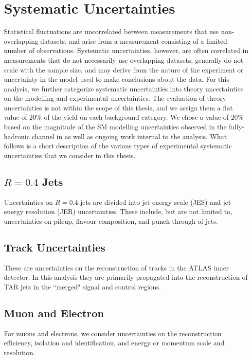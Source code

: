 \section{Systematic Uncertainties}
Statistical fluctuations are uncorrelated between measurements that use non-overlapping datasets, and arise from a measurement consisting of a limited number of observations. Systematic uncertainties, however, are often correlated in measurements that do not necessarily use overlapping datasets, generally do not scale with the sample size, and may derive from the nature of the experiment or uncertainty in the model used to make conclusions about the data.  For this analysis, we further categorize systematic uncertainties into theory uncertainties on the modelling and experimental uncertainties. The evaluation of theory uncertainties is not within the scope of this thesis, and we assign them a flat value of 20\% of the yield on each background category. We chose a value of 20\% based on the magnitude of the SM modelling uncertainties observed in the fully-hadronic channel in \cite{had_analy} as well as ongoing work internal to the analysis. What follows is a short description of the various types of experimental systematic uncertainties that we consider in this thesis.

\subsection{$R=0.4$ Jets}
Uncertainties on $R=0.4$ jets are divided into jet energy scale (JES) and jet energy resolution (JER) uncertainties. These include, but are not limited to, uncertainties on pileup, flavour composition, and punch-through of jets.

\subsection{Track Uncertainties}
These are uncertainties on the reconstruction of tracks in the ATLAS inner detector. In this analysis they are primarily propagated into the reconstruction of TAR jets in the ``merged" signal and control regions.

\subsection{Muon and Electron}
For muons and electrons, we consider uncertainties on the reconstruction efficiency, isolation and identification, and energy or momentum scale and resolution.


